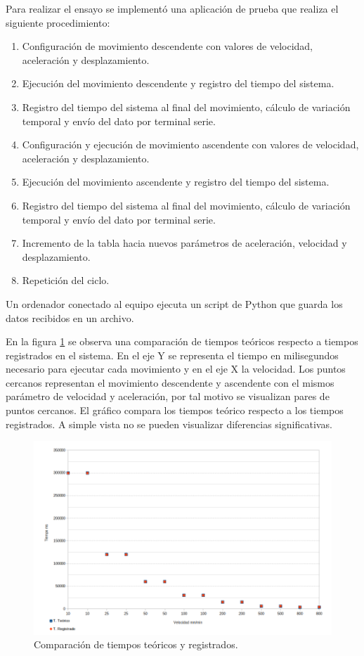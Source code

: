Para realizar el ensayo se implementó una aplicación de prueba que realiza el siguiente procedimiento:

\begin{enumerate}
\item Configuración de movimiento descendente con valores de velocidad, aceleración y desplazamiento.
\item Ejecución del movimiento descendente y registro del tiempo del sistema.
\item Registro del tiempo del sistema al final del movimiento, cálculo de variación temporal y envío del dato por terminal serie.
\item Configuración y ejecución de movimiento ascendente con valores de velocidad, aceleración y desplazamiento.
\item Ejecución del movimiento ascendente y registro del tiempo del sistema.
\item Registro del tiempo del sistema al final del movimiento, cálculo de variación temporal y envío del dato por terminal serie.
\item Incremento de la tabla hacia nuevos parámetros de aceleración, velocidad y desplazamiento.
\item Repetición del ciclo.
\end{enumerate}

Un ordenador conectado al equipo ejecuta un script de Python que guarda los datos recibidos en un archivo.

En la figura \ref{fig:tiempo_movimiento_1} se observa una comparación de tiempos teóricos respecto a  tiempos registrados en el sistema. En el eje Y se representa el tiempo en milisegundos necesario para ejecutar cada movimiento y en el eje X la velocidad. Los puntos cercanos representan el movimiento descendente y ascendente con el mismos parámetro de velocidad y aceleración, por tal motivo se visualizan pares de puntos cercanos. El gráfico compara los tiempos teórico respecto a los tiempos registrados. A simple vista no se pueden visualizar diferencias significativas.

\begin{figure}[h!]
\centering 
\includegraphics[width=1\textwidth]{./Figures/tiempo_movimiento_1.png}
\caption{Comparación de tiempos teóricos y registrados.}
\label{fig:tiempo_movimiento_1}
\end{figure}

